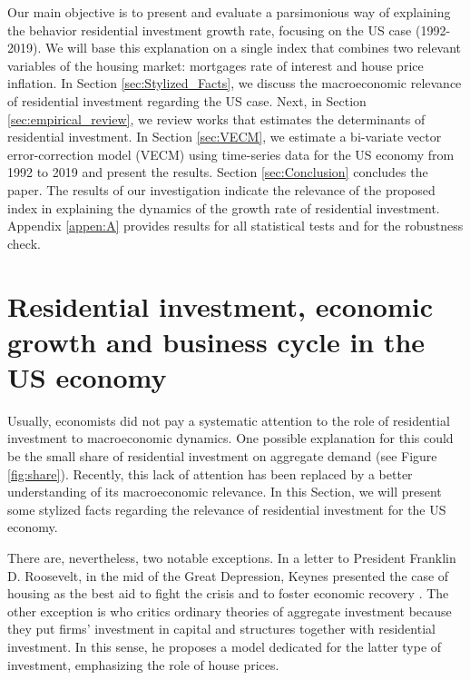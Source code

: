 \documentclass[12pt, a4paper]{article}
\begin{document}
Our main objective is to present and evaluate a parsimonious way of explaining the behavior residential investment growth rate, focusing on the US case (1992-2019).
We will base this explanation on a single index that combines two relevant variables of the housing market: mortgages rate of interest and house price inflation.
In Section \ref{sec:Stylized_Facts}, we discuss the macroeconomic relevance of residential investment regarding the US case.
Next, in Section \ref{sec:empirical_review}, we review works that estimates the determinants of residential investment.
In Section \ref{sec:VECM}, we estimate a bi-variate vector error-correction model (VECM) using time-series data for the US economy from 1992 to 2019 and present the results.
Section \ref{sec:Conclusion} concludes the paper.
The results of our investigation indicate the relevance of the proposed index in explaining the dynamics of the growth rate of residential investment.
Appendix \ref{appen:A} provides results for all statistical tests and for the robustness check.



\section{Residential investment, economic growth and business cycle in the US economy}
\label{sec:org42bd3cf}
\label{sec:Stylized_Facts}
Usually, economists did not pay a systematic attention to the role of residential investment to macroeconomic dynamics.
One possible explanation for this could be the small share of residential investment on aggregate demand (see Figure \ref{fig:share}).
Recently, this lack of attention has been replaced by a better understanding of its macroeconomic relevance.
In this Section, we will present some stylized facts regarding the relevance of residential investment for the US economy.

There are, nevertheless, two notable exceptions.
In a letter to President Franklin D. Roosevelt, in the mid of the Great Depression, Keynes presented the case of housing as the best aid to fight the crisis and to foster economic recovery \cite[p.~436]{keynes_collected_1978}.
The other exception is \textcite{duesenberry_investment_1958} who critics ordinary theories of aggregate investment because they put firms’ investment in capital and structures together with residential investment.
In this sense, he proposes a model dedicated for the latter type of investment, emphasizing the role of house prices.
\end{document}
